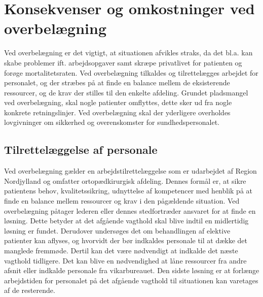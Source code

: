 






\section{Konsekvenser og omkostninger ved overbelægning}
Ved overbelægning er det vigtigt, at situationen afvikles straks, da det bl.a. kan skabe problemer ift. arbejdsopgaver samt skræpe privatlivet for patienten og forøge mortalitetsraten. \cite{Madsen2014}
Ved overbelægning tilkaldes og tilrettelægges arbejdet for personalet, og der stræbes på at finde en balance mellem de eksisterende ressourcer, og de krav der stilles til den enkelte afdeling. \cite{Bjerg2016} Grundet pladsmangel ved overbelægning, skal nogle patienter omflyttes, dette sker ud fra nogle konkrete retningslinjer. \cite{Beredskab2016} Ved overbelægning skal der yderligere overholdes lovgivninger om sikkerhed og overenskomster for sundhedspersonalet. \cite{Beredskab2016}


\subsection{Tilrettelæggelse af personale} \label{Tilret}
Ved overbelægning gælder en arbejdstilrettelæggelse som er udarbejdet af Region Nordjylland og omfatter ortopædkirurgisk afdeling. Dennes formål er, at sikre patientens behov, kvalitetssikring, udnyttelse af kompetencer med henblik på at finde en balance mellem ressourcer og krav i den pågældende situation. Ved overbelægning påtager lederen eller dennes stedfortræder ansvaret for at finde en løsning. Dette betyder at det afgående vagthold skal blive indtil en midlertidig løsning er fundet. Derudover undersøges det om behandlingen af elektive patienter kan aflyses, og hvorvidt der bør indkaldes personale til at dække det manglede fremmøde. Dertil kan det være nødvendigt at indkalde det næste vagthold tidligere. Det kan blive en nødvendighed at låne ressourcer fra andre afsnit eller indkalde personale fra vikarbureauet. Den sidste løsning er at forlænge arbejdstiden for personalet på det afgående vagthold til situationen kan varetages af de resterende. \cite{Bjerg2016}

